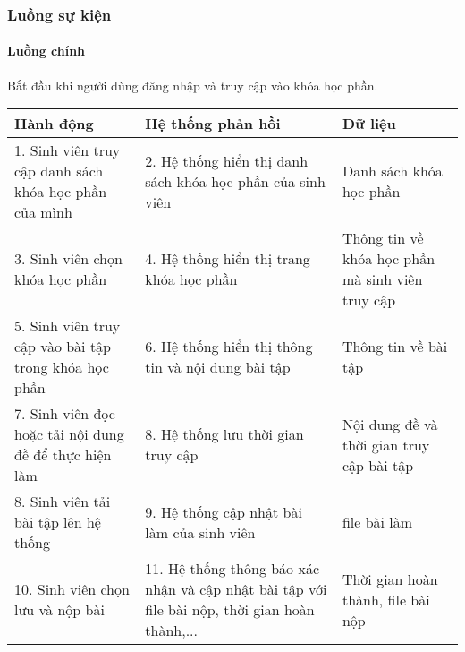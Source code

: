 \documentclass[./../main_file.tex]{subfiles}
\begin{document}
\subsubsection{Luồng sự kiện}
\paragraph{Luồng chính}
Bắt đầu khi người dùng đăng nhập và truy cập vào khóa học phần.
\begin{longtable}{|p{}|p{}|p{}|}
		\hline
		\textbf{Hành động}                                     & \textbf{Hệ thống phản hồi}                                & \textbf{Dữ liệu}                                \\ \hline
		1. Sinh viên truy cập danh sách khóa học phần của mình  & 2. Hệ thống hiển thị danh sách khóa học phần của sinh viên & Danh sách khóa học phần                          \\ \hline
		3. Sinh viên chọn khóa học phần                         & 4.  Hệ thống hiển thị trang khóa học phần                  & Thông tin về khóa học phần mà sinh viên truy cập \\ \hline
		5. Sinh viên truy cập vào bài tập trong khóa học phần   & 6. Hệ thống hiển thị thông tin và nội dung bài tập        & Thông tin về bài tập                            \\ \hline
		7. Sinh viên đọc hoặc tải nội dung đề để thực hiện làm & 8. Hệ thống lưu thời gian truy cập                        & Nội dung đề và thời gian truy cập bài tập       \\ \hline
		8. Sinh viên tải bài tập lên hệ thống                  & 9. Hệ thống cập nhật bài làm của sinh viên                & file bài làm                                    \\ \hline
		10. Sinh viên chọn lưu và nộp bài & 11. Hệ thống thông báo xác nhận và cập nhật bài tập với file bài nộp, thời gian hoàn thành,... & Thời gian hoàn thành, file bài nộp \\ \hline
\end{longtable}
\end{document}
